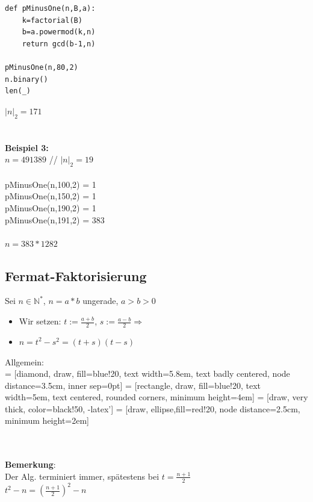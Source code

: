 \documentclass[10pt]{article}
\newcommand{\NN}{\mathbb{N}} %
\newcommand{\Ra}{\Rightarrow}
\begin{document}
\begin{lstlisting}
def pMinusOne(n,B,a): 
	k=factorial(B)
	b=a.powermod(k,n)
	return gcd(b-1,n)
	
pMinusOne(n,80,2)
n.binary()
len(_)
\end{lstlisting}
$|n|_2=171$\\
\\
\\
\textbf{Beispiel 3:} \\
$n=491389$ // $|n|_2=19$ \\ 
\\
pMinusOne(n,100,2) = 1\\
pMinusOne(n,150,2) = 1\\
pMinusOne(n,190,2) = 1\\
pMinusOne(n,191,2) = 383\\
\\
$n=383*1282$

\subsection{Fermat-Faktorisierung}
Sei $n \in \NN^*$, $n=a*b$ ungerade, $a > b > 0$
\begin{itemize}
	\item Wir setzen: $t:=\frac{a+b}{2}$, $s:=\frac{a-b}{2} \Ra$ 
	\item $n=t^2-s^2=(t+s)(t-s)$
\end{itemize}
Allgemein: \\
 = [diamond, draw, fill=blue!20,
   text width=5.8em, text badly centered, node distance=3.5cm, inner sep=0pt]
 = [rectangle, draw, fill=blue!20,
   text width=5em, text centered, rounded corners, minimum height=4em]
 = [draw, very thick, color=black!50, -latex']
 = [draw, ellipse,fill=red!20, node distance=2.5cm,
   minimum height=2em]

 \\ \\
\textbf{Bemerkung}: \\
Der Alg. terminiert immer, spätestens bei $t=\frac{n+1}{2}$ \\
$t^2-n=(\frac{n+1}{2})^2-n$
\end{document}
